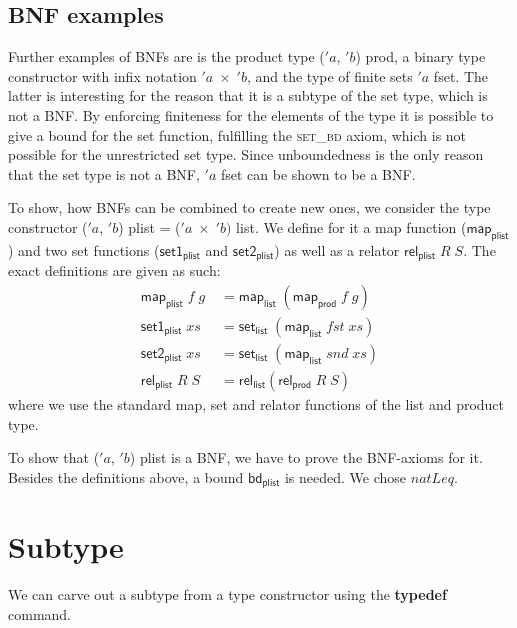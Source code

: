     \subsection{BNF examples}
      Further examples of \acp{BNF} are is the product type \textsf{($'a$, $'b$) prod}, a binary type constructor with infix notation \textsf{$'a\; \times\; 'b$}, and the type of finite sets \textsf{$'a$ fset}. The latter is interesting for the reason that it is a subtype of the set type, which is not a \ac{BNF}. By enforcing finiteness for the elements of the type it is possible to give a bound for the set function, fulfilling the \textsc{set\_bd} axiom, which is not possible for the unrestricted set type. Since unboundedness is the only reason that the set type is not a \ac{BNF}, \textsf{$'a$ fset} can be shown to be a \ac{BNF}.
      
      To show, how \acp{BNF} can be combined to create new ones, we consider the type constructor \textsf{($'a$, $'b$) plist} = \textsf{($'a\; \times\; 'b)$ list}. We define for it a map function ($\textsf{map}_\textsf{plist}$) and two set functions ($\textsf{set1}_\textsf{plist}$ and $\textsf{set2}_\textsf{plist}$) as well as a relator $\textsf{rel}_\textsf{plist}\; R\; S$. The exact definitions are given as such:
      \begin{align*}
        \textsf{map}_\textsf{plist}\; f\; g\; &= \textsf{map}_\textsf{list}\; (\textsf{map}_\textsf{prod}\; f\; g)\\
        \textsf{set1}_\textsf{plist}\; xs &= \textsf{set}_\textsf{list}\; (\textsf{map}_\textsf{list}\; fst\; xs)\\
        \textsf{set2}_\textsf{plist}\; xs &= \textsf{set}_\textsf{list}\; (\textsf{map}_\textsf{list}\; snd\; xs)\\
        \textsf{rel}_\textsf{plist}\; R\; S &= \textsf{rel}_\textsf{list} (\textsf{rel}_\textsf{prod}\; R\; S)
      \end{align*}
      \noindent where we use the standard map, set and relator functions of the list and product type.

      To show that \textsf{($'a$, $'b$) plist} is a \ac{BNF}, we have to prove the \ac{BNF}-axioms for it. Besides the definitions above, a bound $\textsf{bd}_\textsf{plist}$ is needed. We chose $natLeq$. 
      

  \section{Subtype}
    We can carve out a subtype from a type constructor using the \textbf{typedef} command. 

